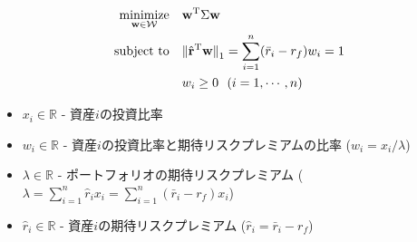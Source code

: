                                                                                                         \begin{align}
                                                                                                            \underset{\bf w \in \mathcal{W}}{\rm minimize} ~~~ 
                                                                                                                & {\bf w}^{\mathrm{T}} \Sigma {\bf w} \\
                                                                                                                    {\rm subject~to} ~~~ 
                                                                                                                        &{\| \hat{\bf r}^{\mathrm{T}} {\bf w} \|}_{1} = \sum_{i=1}^{n} (\bar{r}_i - r_f) w_i = 1 \\
                                                                                                                            &w_i \geq 0 ~~ (i = 1, \cdots, n)
                                                                                                                            \end{align}

                                                                                                                            \begin{itemize}
                                                                                                                                \item $x_i \in \mathbb{R}$ - 資産$i$の投資比率
                                                                                                                                    \item $w_i \in \mathbb{R}$ - 資産$i$の投資比率と期待リスクプレミアムの比率 ($w_i = x_i / \lambda $)
                                                                                                                                        \item $\lambda \in \mathbb{R}$ - ポートフォリオの期待リスクプレミアム ($\lambda = \sum_{i=1}^{n} \hat{r}_i x_i = \sum_{i=1}^{n} (\bar{r}_i - r_f) x_i$)
                                                                                                                                            \item $\hat{r}_i \in \mathbb{R}$ - 資産$i$の期待リスクプレミアム ($\hat{r}_i = \bar{r}_i - r_f$)
                                                                                                                                            \end{itemize}

